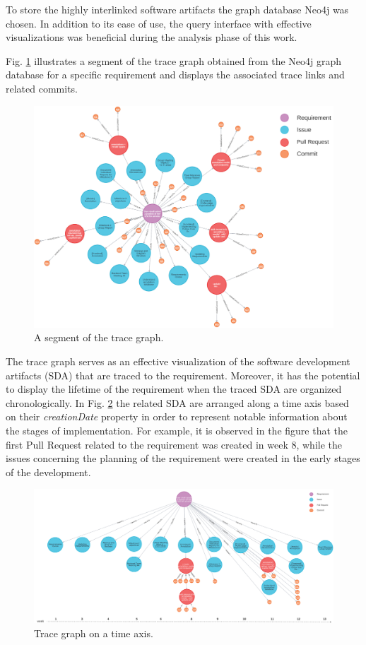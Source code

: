 To store the highly interlinked software artifacts the graph database Neo4j was chosen.
In addition to its ease of use, the query interface with effective visualizations was beneficial during the analysis phase of this work.

Fig. \ref{fig:rawtracegraph} illustrates a segment of the trace graph obtained from the Neo4j graph database for a specific requirement and displays the associated trace links and related commits.

\begin{figure}[htb]
    \centering
    \includegraphics[width=1\linewidth]{figs/rawTraceGraph.png}
    \caption{A segment of the trace graph.}
    \label{fig:rawtracegraph}
\end{figure}

The trace graph serves as an effective visualization of the software development artifacts (SDA) that are traced to the requirement. Moreover, it has the potential to display the lifetime of the requirement when the traced SDA are organized chronologically.
In Fig. \ref{fig:tracegraph} the related SDA are arranged along a time axis based on their \textit{creationDate} property in order to represent notable information about the stages of implementation. For example, it is observed in the figure that the first Pull Request related to the requirement was created in week 8, while the issues concerning the planning of the requirement were created in the early stages of the development.


\begin{figure}[htb]
    \centering
    \includegraphics[width=1\linewidth]{figs/traceGraph.png}
    \caption{Trace graph on a time axis.}
    \label{fig:tracegraph}
\end{figure}

